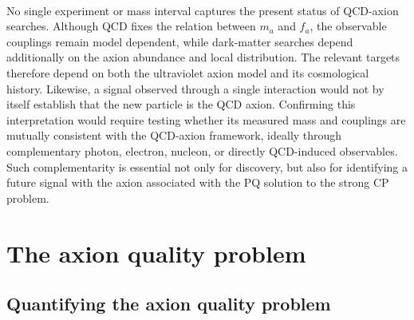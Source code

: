 \documentclass[review]{elsarticle}
\numberwithin{equation}{section}
\numberwithin{table}{section}
\numberwithin{figure}{section}
\begin{document}
\paragraph{} No single experiment or mass interval captures the present status of QCD-axion searches. Although QCD fixes the relation between $m_a$ and $f_a$, the observable couplings remain model dependent, while dark-matter searches depend additionally on the axion abundance and local distribution. The relevant targets therefore depend on both the ultraviolet axion model and its cosmological history. Likewise, a signal observed through a single interaction would not by itself establish that the new particle is the QCD axion. Confirming this interpretation would require testing whether its measured mass and couplings are mutually consistent with the QCD-axion framework, ideally through complementary photon, electron, nucleon, or directly QCD-induced observables. Such complementarity is essential not only for discovery, but also for identifying a future signal with the axion associated with the PQ solution to the strong CP problem.


\section{The axion quality problem}
\label{sec:axion-quality-problem}

\subsection{Quantifying the axion quality problem}
\label{sec:axion-quality-criterion}
\end{document}
